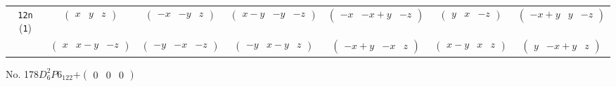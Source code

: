 \documentclass[fleqn,9pt,landscape]{jsarticle}
\begin{document}
\begin{center}
\begin{longtable}{ccccccc}
{\tt 12n} ({\tt 1}) & $ \begin{pmatrix} x & y & z \end{pmatrix} $ & $ \begin{pmatrix} - x & - y & z \end{pmatrix} $ & $ \begin{pmatrix} x - y & - y & - z \end{pmatrix} $ & $ \begin{pmatrix} - x & - x + y & - z \end{pmatrix} $ & $ \begin{pmatrix} y & x & - z \end{pmatrix} $ & $ \begin{pmatrix} - x + y & y & - z \end{pmatrix} $ \\
& $ \begin{pmatrix} x & x - y & - z \end{pmatrix} $ & $ \begin{pmatrix} - y & - x & - z \end{pmatrix} $ & $ \begin{pmatrix} - y & x - y & z \end{pmatrix} $ & $ \begin{pmatrix} - x + y & - x & z \end{pmatrix} $ & $ \begin{pmatrix} x - y & x & z \end{pmatrix} $ & $ \begin{pmatrix} y & - x + y & z \end{pmatrix} $ \\
\end{longtable}
\end{center}
\newpage
No. 178\quad$D_{6}^{2}$\quad$P6_122$\quad[ hexagonal ]\quad$+\begin{pmatrix} 0 & 0 & 0 \end{pmatrix}$
\end{document}
